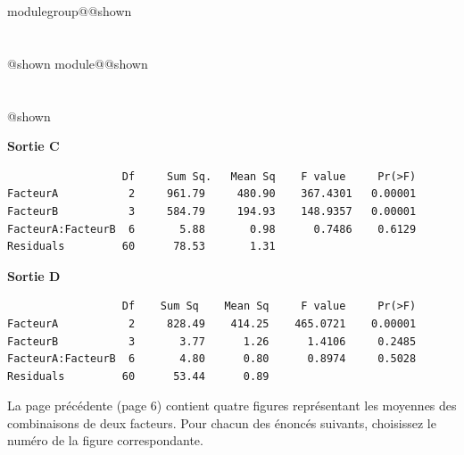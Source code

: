 \documentclass{Evaluation}
\makeatletter
\newcommand{\currentmodulekey}{}
\newcommand{\currentmoduletitle}{}
\newcommand{\currentgroupkey}{}
\newcommand{\currentgrouptitle}{}
\newcommand{\showmoduleifneeded}{%
  \ifx\currentgroupkey\empty\else
    \expandafter\ifx\csname modulegroup@\currentgroupkey @shown\endcsname\relax
      \section*{\currentgrouptitle}%
      \expandafter\gdef\csname modulegroup@\currentgroupkey @shown\endcsname{1}%
    \fi
  \fi
  \expandafter\ifx\csname module@\currentmodulekey @shown\endcsname\relax
    \section*{\currentmoduletitle}%
    \expandafter\gdef\csname module@\currentmodulekey @shown\endcsname{1}%
  \fi
}
\newenvironment{A22}{\showmoduleifneeded}{}
\makeatother
\begin{document}
\begin{questions}
\begin{A22}
{\bf Sortie C}
\begin{verbatim}
                  Df     Sum Sq.   Mean Sq    F value     Pr(>F)    
FacteurA           2     961.79     480.90    367.4301   0.00001
FacteurB           3     584.79     194.93    148.9357   0.00001
FacteurA:FacteurB  6       5.88       0.98      0.7486    0.6129    
Residuals         60      78.53       1.31                         
\end{verbatim}

{\bf Sortie D}
\begin{verbatim}
                  Df    Sum Sq    Mean Sq     F value     Pr(>F)    
FacteurA           2     828.49    414.25    465.0721    0.00001
FacteurB           3       3.77      1.26      1.4106     0.2485    
FacteurA:FacteurB  6       4.80      0.80      0.8974     0.5028    
Residuals         60      53.44      0.89               
\end{verbatim}

\medskip
La page précédente (page 6) contient quatre figures représentant les moyennes des combinaisons de deux facteurs.
Pour chacun des énoncés suivants, choisissez le numéro de la figure correspondante.

\medskip\medskip
{}
\end{A22}
\end{questions}
\end{document}
